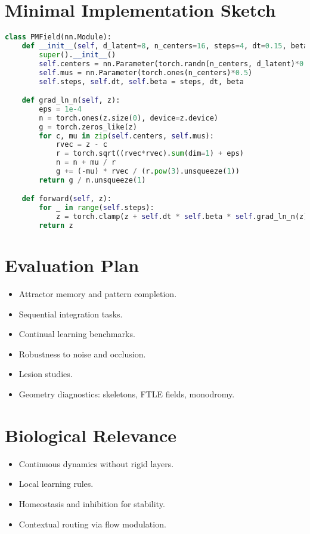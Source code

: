 \documentclass[12pt]{article}
\begin{document}
\section{Minimal Implementation Sketch}
\begin{lstlisting}[language=Python]
class PMField(nn.Module):
    def __init__(self, d_latent=8, n_centers=16, steps=4, dt=0.15, beta=1.0):
        super().__init__()
        self.centers = nn.Parameter(torch.randn(n_centers, d_latent)*0.7)
        self.mus = nn.Parameter(torch.ones(n_centers)*0.5)
        self.steps, self.dt, self.beta = steps, dt, beta

    def grad_ln_n(self, z):
        eps = 1e-4
        n = torch.ones(z.size(0), device=z.device)
        g = torch.zeros_like(z)
        for c, mu in zip(self.centers, self.mus):
            rvec = z - c
            r = torch.sqrt((rvec*rvec).sum(dim=1) + eps)
            n = n + mu / r
            g += (-mu) * rvec / (r.pow(3).unsqueeze(1))
        return g / n.unsqueeze(1)

    def forward(self, z):
        for _ in range(self.steps):
            z = torch.clamp(z + self.dt * self.beta * self.grad_ln_n(z), -3.0, 3.0)
        return z
\end{lstlisting}

\section{Evaluation Plan}
\begin{itemize}
    \item Attractor memory and pattern completion.
    \item Sequential integration tasks.
    \item Continual learning benchmarks.
    \item Robustness to noise and occlusion.
    \item Lesion studies.
    \item Geometry diagnostics: skeletons, FTLE fields, monodromy.
\end{itemize}

\section{Biological Relevance}
\begin{itemize}
    \item Continuous dynamics without rigid layers.
    \item Local learning rules.
    \item Homeostasis and inhibition for stability.
    \item Contextual routing via flow modulation.
\end{itemize}
\end{document}
